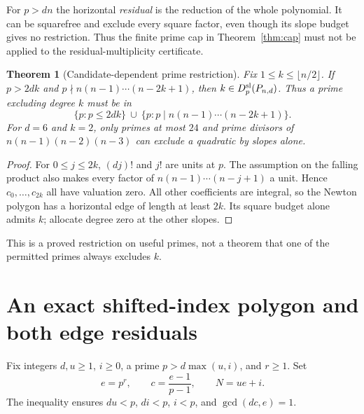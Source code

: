 \documentclass[11pt]{article}
\newtheorem{theorem}{Theorem}
\begin{document}
For $p>dn$ the horizontal \emph{residual} is the reduction of the
whole polynomial. It can be squarefree and exclude every square
factor, even though its slope budget gives no restriction. Thus the
finite prime cap in Theorem~\ref{thm:cap} must not be applied to the
residual-multiplicity certificate.

\begin{theorem}[Candidate-dependent prime restriction]\label{thm:candidate}
Fix $1\le k\le\lfloor n/2\rfloor$. If $p>2dk$ and
$p\nmid n(n-1)\cdots(n-2k+1)$, then
$k\in D_p^{\rm sl}(P_{n,d})$.
Thus a prime excluding degree $k$ must be in
\[
 \{p:p\le2dk\}\ \cup\
 \{p:p\mid n(n-1)\cdots(n-2k+1)\}. \tag{3}
\]
For $d=6$ and $k=2$, only primes at most $24$ and prime divisors of
$n(n-1)(n-2)(n-3)$ can exclude a quadratic by slopes alone.
\end{theorem}
\begin{proof}
For $0\le j\le2k$, $(dj)!$ and $j!$ are units at $p$. The assumption
on the falling product also makes every factor of
$n(n-1)\cdots(n-j+1)$ a unit. Hence $c_0,\ldots,c_{2k}$ all have
valuation zero. All other coefficients are integral, so the Newton
polygon has a horizontal edge of length at least $2k$. Its square
budget alone admits $k$; allocate degree zero at the other slopes.
\end{proof}
This is a proved restriction on useful primes, not a theorem that
one of the permitted primes always excludes $k$.

\section{An exact shifted-index polygon and both edge residuals}
Fix integers $d,u\ge1$, $i\ge0$, a prime $p>d\max(u,i)$, and $r\ge1$.
Set
\[
 e=p^r,\qquad c=\frac{e-1}{p-1},\qquad N=ue+i.
\]
The inequality ensures $du<p$, $di<p$, $i<p$, and $\gcd(dc,e)=1$.
\end{document}
